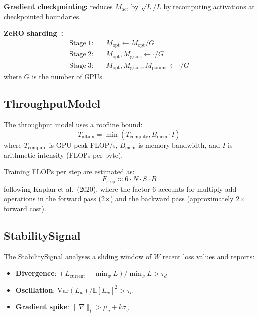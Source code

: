 \documentclass[10pt,twocolumn]{article}
\begin{document}
\textbf{Gradient checkpointing:} reduces $M_\text{act}$ by $\sqrt{L}/L$
by recomputing activations at checkpointed boundaries.

\textbf{ZeRO sharding~\cite{rajbhandari2020zero}:}
\begin{align}
\text{Stage 1:} &\quad M_\text{opt} \leftarrow M_\text{opt} / G \\
\text{Stage 2:} &\quad M_\text{opt}, M_\text{grads} \leftarrow \cdot / G \\
\text{Stage 3:} &\quad M_\text{opt}, M_\text{grads}, M_\text{params} \leftarrow \cdot / G
\end{align}
where $G$ is the number of GPUs.

\subsection{ThroughputModel}

The throughput model uses a roofline bound:
\begin{equation}
T_\text{attain} = \min(T_\text{compute}, B_\text{mem} \cdot I)
\end{equation}
where $T_\text{compute}$ is GPU peak FLOP/s, $B_\text{mem}$ is memory
bandwidth, and $I$ is arithmetic intensity (FLOPs per byte).

Training FLOPs per step are estimated as:
\begin{equation}
F_\text{step} \approx 6 \cdot N \cdot S \cdot B
\end{equation}
following Kaplan et al.~(2020), where the factor 6 accounts for
multiply-add operations in the forward pass (2$\times$) and the backward pass
(approximately 2$\times$ forward cost).

\subsection{StabilitySignal}

The StabilitySignal analyses a sliding window of $W$ recent loss values and
reports:

\begin{itemize}
  \item \textbf{Divergence}: $(L_\text{current} - \min_w L) / \min_w L > \tau_d$
  \item \textbf{Oscillation}: $\text{Var}(L_w) / \mathbb{E}[L_w]^2 > \tau_o$
  \item \textbf{Gradient spike}: $\|\nabla\|_t > \mu_g + k \sigma_g$
\end{itemize}
\end{document}
